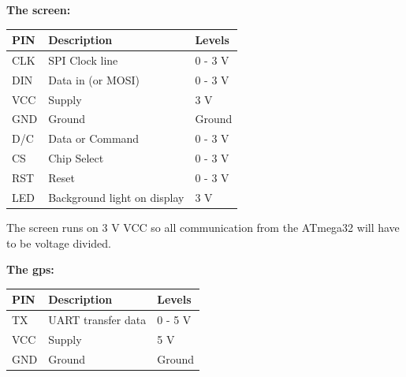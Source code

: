 \textbf{The screen:}\\
\begin{table}[H]
\centering
    \begin{tabular}{|l|l|l|}
    \hline
    PIN & Description    & Levels  \\ \hline
    CLK & SPI Clock line & 0 - 3 V \\ \hline
    DIN & Data in (or MOSI)  & 0 - 3 V \\ \hline
    VCC & Supply         & 3 V     \\ \hline
    GND & Ground         & Ground  \\ \hline
    D/C & Data or Command & 0 - 3 V \\ \hline
    CS  & Chip Select    & 0 - 3 V \\ \hline
    RST & Reset			 & 0 - 3 V \\ \hline
    LED & Background light on display & 3 V \\ \hline
    \end{tabular}
\end{table}
The screen runs on 3 V VCC so all communication from the ATmega32 will have to be voltage divided. 

\textbf{The gps:}\\
\begin{table}[H]
\centering
    \begin{tabular}{|l|l|l|}
    \hline
    PIN & Description    & Levels  \\ \hline
    TX & UART transfer data  & 0 - 5 V \\ \hline
    VCC & Supply         & 5 V     \\ \hline
    GND & Ground         & Ground  \\ \hline
    \end{tabular}
\end{table}